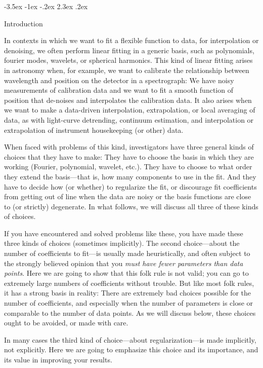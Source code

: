 \documentclass[12pt,letterpaper]{article}
\makeatletter
\renewcommand\section{\@startsection {section}{1}{\z@}%
  {-3.5ex \@plus -1ex \@minus -.2ex}%
  {2.3ex \@plus.2ex}%
  {\raggedright\normalfont\Large\bfseries}}
\makeatother
\begin{document}
\section{Introduction}

In contexts in which we want to fit a flexible function to data, for interpolation or denoising, we often perform linear fitting in a generic basis, such as polynomials, fourier modes, wavelets, or spherical harmonics.
This kind of linear fitting arises in astronomy when, for example, we want to calibrate the relationship between wavelength and position on the detector in a spectrograph:
We have noisy measurements of calibration data and we want to fit a smooth function of position that de-noises and interpolates the calibration data.
It also arises when we want to make a data-driven interpolation, extrapolation, or local averaging of data, as with light-curve detrending, continuum estimation, and interpolation or extrapolation of instrument housekeeping (or other) data.

When faced with problems of this kind, investigators have three general kinds of choices that they have to make:
They have to choose the basis in which they are working (Fourier, polynomial, wavelet, etc.).
They have to choose to what order they extend the basis---that is, how many components to use in the fit.
And they have to decide how (or whether) to regularize the fit, or discourage fit coefficients from getting out of line when the data are noisy or the basis functions are close to (or strictly) degenerate.
In what follows, we will discuss all three of these kinds of choices.

If you have encountered and solved problems like these, you have made these three kinds of choices (sometimes implicitly).
The second choice---about the number of coefficients to fit---is usually made heuristically, and often subject to the strongly believed opinion that you \emph{must have fewer parameters than data points}.
Here we are going to show that this folk rule is not valid; you can go to extremely large numbers of coefficients without trouble.
But like most folk rules, it has a strong basis in reality: There are extremely bad choices possible for the number of coefficients, and especially when the number of parameters is close or comparable to the number of data points.
As we will discuss below, these choices ought to be avoided, or made with care.

In many cases the third kind of choice---about regularization---is made implicitly, not explicitly.
Here we are going to emphasize this choice and its importance, and its value in improving your results.
\end{document}

